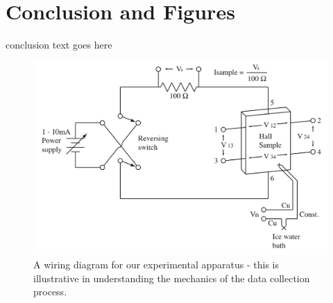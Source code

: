 \documentclass[reprint, nobibnotes, amssymb, amsmath, amsfonts, physics, mathtools, mathrsfs, floatfix]{revtex4-1}
\begin{document}
    \section{Conclusion and Figures}

    conclusion text goes here

    \begin{widetext}

      \begin{figure}[h]
        \centering
        \includegraphics[width=\linewidth]{circuit_diagram.png}
        \caption{A wiring diagram for our experimental apparatus - this is illustrative in understanding the mechanics of the data collection process.~\label{circuit_diagram}~\cite{lab_manual}}
      \end{figure}


\end{widetext}
\end{document}

